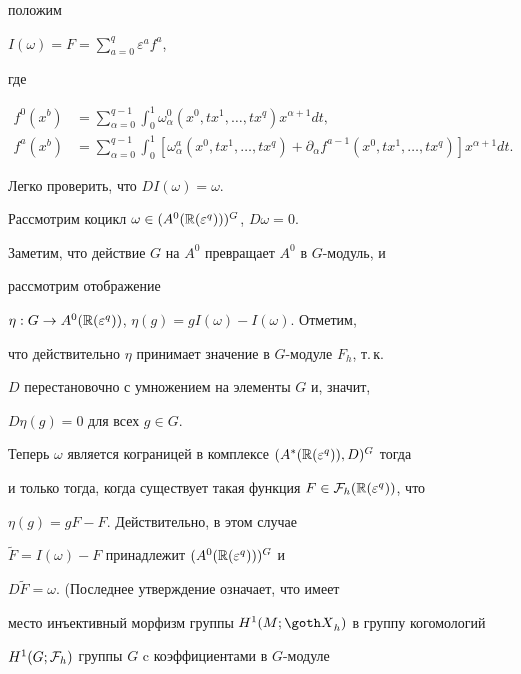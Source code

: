 \begin{exam}
положим


$I(\omega) = F = \sum\limits_{a=0}^q\varepsilon^af^a$,


где


\begin{align*}


f^0(x^b) &=


\sum_{\alpha = 0}^{q-1}


\int_0^1 \omega_\alpha^0(x^0, tx^1, \dotsc, tx^q) x^{\alpha + 1} dt,\\


%


f^a(x^b) &=


\sum_{\alpha = 0}^{q-1}


\int_0^1 [\omega_\alpha^a(x^0, tx^1, \dotsc, tx^q)


+\partial_\alpha f^{a-1}(x^0, tx^1, \dotsc, tx^q)]x^{\alpha + 1} dt.


\end{align*}


Легко проверить, что $DI(\omega) = \omega$.





Рассмотрим коцикл $\omega \in (A^0(\Bbb R(\varepsilon^q)))^G$, $D\omega = 0$.


Заметим, что действие $G$ на $A^0$ превращает $A^0$ в $G$-модуль, и


рассмотрим отображение


$\eta : G \to A^0(\Bbb R(\varepsilon^q))$, $\eta(g) = gI(\omega) - I(\omega)$. Отметим,


что действительно $\eta$ принимает значение в $G$-модуле $F_h$, т.\,к.


$D$ перестановочно с умножением на элементы $G$ и, значит,


$D\eta(g) = 0$ для всех $g \in G$.


Теперь $\omega$ является кограницей в комплексе $(A^*(\Bbb R(\varepsilon^q)), D)^G$ тогда


и только тогда, когда существует такая функция $F \in {\cal F}_h(\Bbb R(\varepsilon^q))$, что


$\eta(g) = gF - F$. Действительно, в этом случае


$\widetilde F = I(\omega) - F$ принадлежит $(A^0(\Bbb R(\varepsilon^q)))^G$ и


$D\widetilde F = \omega$. (Последнее утверждение означает, что имеет


место инъективный морфизм группы $H^1(M;{\goth X}_h)$ в группу когомологий


$H^1(G;{\cal F}_h)$ группы $G$ c коэффициентами в $G$-модуле



\end{exam}
